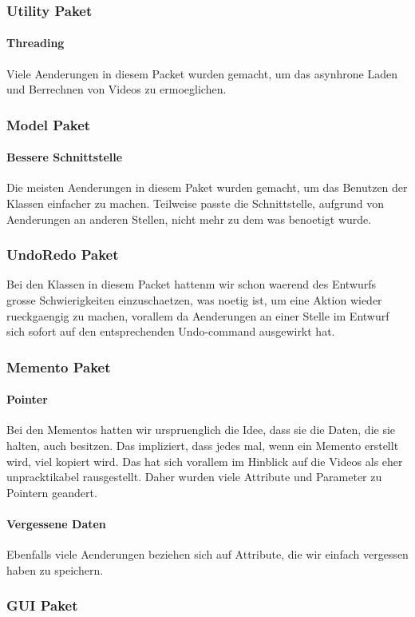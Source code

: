 \documentclass{scrartcl}
\begin{document}
{\subsubsection{Utility Paket}
\paragraph{Threading}
Viele Aenderungen in diesem Packet wurden gemacht, um das  asynhrone Laden und Berrechnen von Videos zu ermoeglichen.
\subsubsection{Model Paket}
\paragraph{Bessere Schnittstelle} Die meisten Aenderungen in diesem Paket wurden gemacht, um das Benutzen der Klassen einfacher zu machen. Teilweise passte die Schnittstelle, aufgrund von Aenderungen an anderen Stellen, nicht mehr zu dem was benoetigt wurde.
\subsubsection{UndoRedo Paket}
Bei den Klassen in diesem Packet hattenm wir schon waerend des Entwurfs grosse Schwierigkeiten einzuschaetzen, was noetig ist, um eine Aktion wieder rueckgaengig zu machen, vorallem da Aenderungen an einer Stelle im Entwurf sich sofort auf den entsprechenden Undo-command ausgewirkt hat.
\subsubsection{Memento Paket}
\paragraph{Pointer} Bei den Mementos hatten wir urspruenglich die Idee, dass sie die Daten, die sie halten, auch besitzen. Das impliziert, dass jedes mal, wenn ein Memento erstellt wird, viel kopiert wird. Das hat sich vorallem im Hinblick auf die Videos als eher unpracktikabel rausgestellt. Daher wurden viele Attribute und Parameter zu Pointern geandert.
\paragraph{Vergessene Daten} Ebenfalls viele Aenderungen beziehen sich auf Attribute, die wir einfach vergessen haben zu speichern.
\subsubsection{GUI Paket}
}
\end{document}
